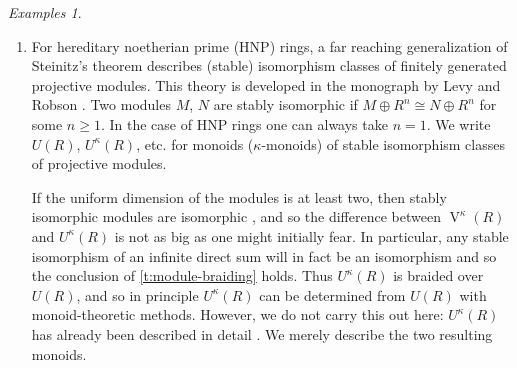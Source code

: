 \documentclass[a4paper,11pt,oneside]{amsart}
\theoremstyle{remark}
\newtheorem{examples}[teor]{Examples}
\newcommand{\bN}{\mathbb N}
\DeclareMathOperator{\Vmon}{V}
\begin{document}
\begin{examples}
\begin{enumerate}
    If $R$ is non-noetherian one can also realize monoids defined by homogeneous linear inequalities \cite[Theorem 1.6]{infinitepullback}, but a full description of all possible $\Vmon^*(R)$ is not known.
    
    From the fact that the components of $\bN_0^n$ are induced by a dimension vector on modules over $R/J(R)$, it is easy to see that the monoids described by Herbera and Příhoda are in fact $\aleph_0$-submonoids of $F_{\aleph_0}^n$.
    Thus their work fully describes $\Vmon^{\aleph_0}(R)$.
    It is now possible, with our purely monoid-theoretical methods, to extend this to a description of $\Vmon^{\kappa}(R)$: indeed $\Vmon^{\kappa}(R)$ is the $\kappa$-submonoid of $F_\kappa^n$ defined by the same linear equations, inequalities, and congruences as $\Vmon^{\aleph_0}(R)$ by \ref{ext-diophantine:kappa} of \cref{p:ext-diophantine}.

    In the special case that every projective module is a direct sum of finitely generated projective modules, the monoids $\Vmon^{\aleph_0}(R)$ in turn afford an easy description in terms of $\Vmon(R)$ \cite[Corollary 7.9]{PavelHerbera}.
    As one would expect, we can now recover this result using our monoid-theoretical methods (specifically, this is \ref{ext-diophantine:aleph} of \cref{p:ext-diophantine}).

  \item For hereditary noetherian prime (HNP) rings, a far reaching generalization of Steinitz's theorem describes (stable) isomorphism classes of finitely generated projective modules.
    This theory is developed in the monograph by Levy and Robson \cite{LevyRobson11}.
    Two modules $M$, $N$ are stably isomorphic if $M \oplus R^n \cong N \oplus R^n$ for some $n \ge 1$.
    In the case of HNP rings one can always take $n = 1$.
    We write $U(R)$, $U^{\kappa}(R)$, etc. for monoids ($\kappa$-monoids) of stable isomorphism classes of projective modules.

    If the uniform dimension of the modules is at least two, then stably isomorphic modules are isomorphic \cite[Theorem 34.6]{LevyRobson11}, and so the difference between $\Vmon^{\kappa}(R)$ and $U^{\kappa}(R)$ is not as big as one might initially fear.
    In particular, any stable isomorphism of an infinite direct sum will in fact be an isomorphism and so the conclusion of \cref{t:module-braiding} holds.
    Thus $U^{\kappa}(R)$ is braided over $U(R)$, and so in principle $U^{\kappa}(R)$ can be determined from $U(R)$ with monoid-theoretic methods.
    However, we do not carry this out here: $U^{\kappa}(R)$ has already been described  in detail \cite[Chapter 8]{LevyRobson11}.
    We merely describe the two resulting monoids.


\end{enumerate}
\end{examples}
\end{document}
